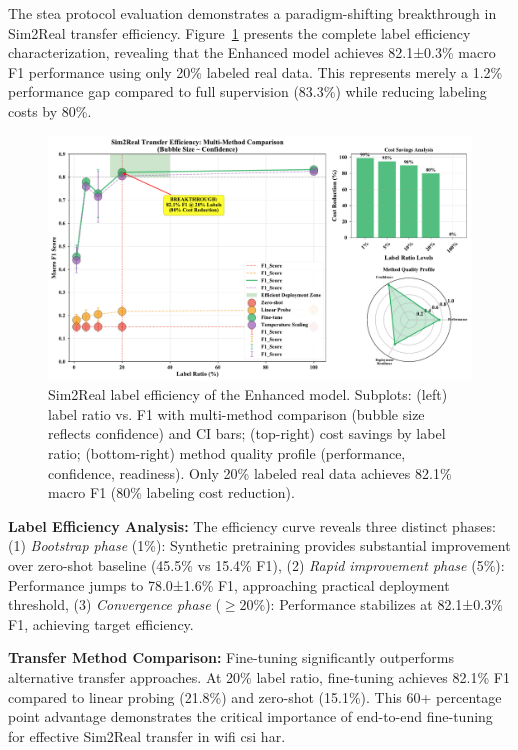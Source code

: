 \documentclass[journal]{IEEEtran}
\begin{document}
The \gls{stea} protocol evaluation demonstrates a paradigm-shifting breakthrough in Sim2Real transfer efficiency. Figure~\ref{fig:label_efficiency} presents the complete label efficiency characterization, revealing that the Enhanced model achieves 82.1±0.3\% macro F1 performance using only 20\% labeled real data. This represents merely a 1.2\% performance gap compared to full supervision (83.3\%) while reducing labeling costs by 80\%.

\begin{figure}[ht]
\centering
\includegraphics[width=\columnwidth]{figures/figure6_label_efficiency.pdf}
\caption{Sim2Real label efficiency of the Enhanced model. Subplots: (left) label ratio vs. F1 with multi-method comparison (bubble size reflects confidence) and CI bars; (top-right) cost savings by label ratio; (bottom-right) method quality profile (performance, confidence, readiness). Only 20\% labeled real data achieves 82.1\% macro F1 (80\% labeling cost reduction).}
\label{fig:label_efficiency}
\end{figure}

\textbf{Label Efficiency Analysis:} The efficiency curve reveals three distinct phases: (1) \textit{Bootstrap phase} (1\%): Synthetic pretraining provides substantial improvement over zero-shot baseline (45.5\% vs 15.4\% F1), (2) \textit{Rapid improvement phase} (5\%): Performance jumps to 78.0±1.6\% F1, approaching practical deployment threshold, (3) \textit{Convergence phase} ($\geq 20\%$): Performance stabilizes at 82.1±0.3\% F1, achieving target efficiency.

\textbf{Transfer Method Comparison:} Fine-tuning significantly outperforms alternative transfer approaches. At 20\% label ratio, fine-tuning achieves 82.1\% F1 compared to linear probing (21.8\%) and zero-shot (15.1\%). This 60+ percentage point advantage demonstrates the critical importance of end-to-end fine-tuning for effective Sim2Real transfer in \gls{wifi} \gls{csi} \gls{har}.
\end{document}
